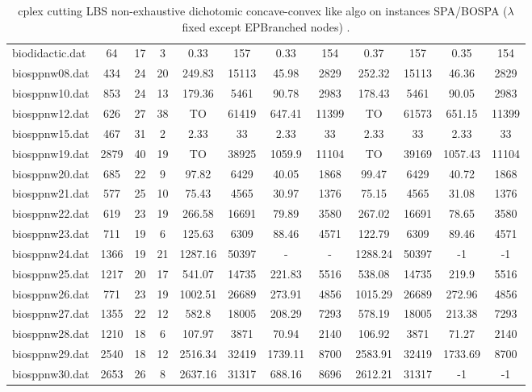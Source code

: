 \begin{sidewaystable}[!ht]
{\begin{tabular}{lccccccccccc}
biodidactic.dat & 64 & 17 & 3 & 0.33 & 157 & 0.33 & 154 & 0.37 & 157 & 0.35 & 154 \\
biosppnw08.dat & 434 & 24 & 20 & 249.83 & 15113 &  \textcolor{blue2}{45.98} & 2829 & 252.32 & 15113 & 46.36 & 2829 \\
biosppnw10.dat & 853 & 24 & 13 & 179.36 & 5461 & 90.78 & 2983 & 178.43 & 5461 &  \textcolor{blue2}{90.05} & 2983 \\
biosppnw12.dat & 626 & 27 & 38 &  TO & 61419 &  \textcolor{blue2}{647.41} & 11399 &  TO & 61573 & 651.15 & 11399 \\
biosppnw15.dat & 467 & 31 & 2 & 2.33 & 33 & 2.33 & 33 & 2.33 & 33 & 2.33 & 33 \\
biosppnw19.dat & 2879 & 40 & 19 &  TO & 38925 & 1059.9 & 11104 &  TO & 39169 & 1057.43 & 11104 \\
biosppnw20.dat & 685 & 22 & 9 & 97.82 & 6429 & 40.05 & 1868 & 99.47 & 6429 & 40.72 & 1868 \\
biosppnw21.dat & 577 & 25 & 10 & 75.43 & 4565 &  \textcolor{blue2}{30.97} & 1376 & 75.15 & 4565 & 31.08 & 1376 \\
biosppnw22.dat & 619 & 23 & 19 & 266.58 & 16691 & 79.89 & 3580 & 267.02 & 16691 & 78.65 & 3580 \\
biosppnw23.dat & 711 & 19 & 6 & 125.63 & 6309 &  \textcolor{blue2}{88.46} & 4571 & 122.79 & 6309 & 89.46 & 4571 \\
biosppnw24.dat & 1366 & 19 & 21 & 1287.16 & 50397 &  - &  - & 1288.24 & 50397 & -1 & -1 \\
biosppnw25.dat & 1217 & 20 & 17 & 541.07 & 14735 & 221.83 & 5516 & 538.08 & 14735 &  \textcolor{blue2}{219.9} & 5516 \\
biosppnw26.dat & 771 & 23 & 19 & 1002.51 & 26689 & 273.91 & 4856 & 1015.29 & 26689 &  \textcolor{blue2}{272.96} & 4856 \\
biosppnw27.dat & 1355 & 22 & 12 & 582.8 & 18005 &  \textcolor{blue2}{208.29} & 7293 & 578.19 & 18005 & 213.38 & 7293 \\
biosppnw28.dat & 1210 & 18 & 6 & 107.97 & 3871 &  \textcolor{blue2}{70.94} & 2140 & 106.92 & 3871 & 71.27 & 2140 \\
biosppnw29.dat & 2540 & 18 & 12 & 2516.34 & 32419 & 1739.11 & 8700 & 2583.91 & 32419 &  \textcolor{blue2}{1733.69} & 8700 \\
biosppnw30.dat & 2653 & 26 & 8 & 2637.16 & 31317 & 688.16 & 8696 & 2612.21 & 31317 & -1 & -1 \\
\bottomrule
\end{tabular}
}%
\caption{cplex cutting LBS non-exhaustive dichotomic concave-convex like algo on instances SPA/BOSPA ($\lambda$ fixed except EPBranched nodes) .}
\end{sidewaystable}
